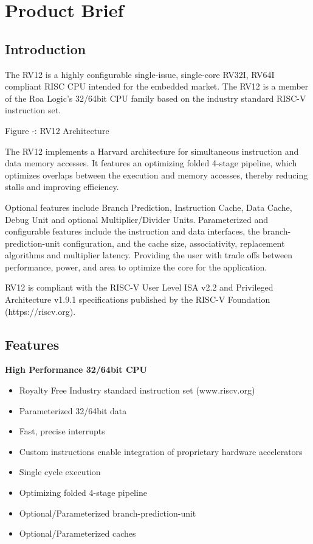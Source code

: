\section{Product Brief}\label{product-brief}

\subsection{Introduction}\label{introduction}

The RV12 is a highly configurable single-issue, single-core RV32I, RV64I
compliant RISC CPU intended for the embedded market. The RV12 is a
member of the Roa Logic's 32/64bit CPU family based on the industry
standard RISC-V instruction set.


Figure ‑: RV12 Architecture

The RV12 implements a Harvard architecture for simultaneous instruction
and data memory accesses. It features an optimizing folded 4-stage
pipeline, which optimizes overlaps between the execution and memory
accesses, thereby reducing stalls and improving efficiency.

Optional features include Branch Prediction, Instruction Cache, Data
Cache, Debug Unit and optional Multiplier/Divider Units. Parameterized
and configurable features include the instruction and data interfaces,
the branch-prediction-unit configuration, and the cache size,
associativity, replacement algorithms and multiplier latency. Providing
the user with trade offs between performance, power, and area to
optimize the core for the application.

RV12 is compliant with the RISC-V User Level ISA v2.2 and Privileged
Architecture v1.9.1 specifications published by the RISC-V Foundation
(https://riscv.org).

\subsection{Features}\label{features}

\textbf{High Performance 32/64bit CPU}

\begin{itemize}
\item
  Royalty Free Industry standard instruction set (www.riscv.org)
\item
  Parameterized 32/64bit data
\item
  Fast, precise interrupts
\item
  Custom instructions enable integration of proprietary hardware
  accelerators
\item
  Single cycle execution
\item
  Optimizing folded 4-stage pipeline
\item
  Optional/Parameterized branch-prediction-unit
\item
  Optional/Parameterized caches
\end{itemize}


